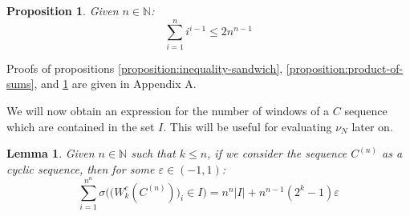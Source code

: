 \documentclass[11pt,a4paper]{tesis}
\theoremstyle{plain}
\newtheorem{lemma}[theorem]{Lemma}
\newtheorem{proposition}[theorem]{Proposition}
\theoremstyle{definition}
\begin{document}
\begin{proposition}\label{proposition:sum-i-to-the-i-m-1}
  Given $n \in \mathbb{N}$:
  \begin{equation*}
    \sum_{i = 1}^{n} i^{i - 1} \le 2 n^{n - 1}
  \end{equation*}
\end{proposition}

Proofs of propositions \ref{proposition:inequality-sandwich}, \ref{proposition:product-of-sums}, and \ref{proposition:sum-i-to-the-i-m-1} are given in Appendix A.

We will now obtain an expression for the number of windows of a $C$ sequence which are contained in the set $I$. This will be useful for evaluating $\nu_N$ later on.

\begin{lemma}\label{lemma:count-windows-c-sequence-cyclic}
  Given $n \in \mathbb{N}$ such that $k \le n$, if we consider the sequence $C^{(n)}$ as a cyclic sequence, then for some $\varepsilon \in (-1, 1)$:
  \begin{equation*}
    \sum_{i = 1}^{n^n} \sigma\Big( \big( W_k^{c}(C^{(n)}) \big)_i \in I \Big) = n^n |I| + n^{n - 1} (2^k - 1) \varepsilon
  \end{equation*}
\end{lemma}
\end{document}

